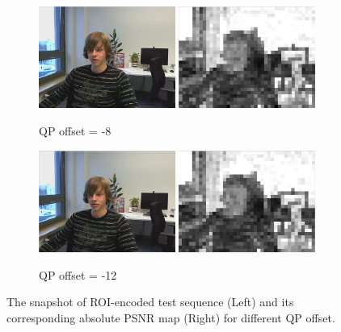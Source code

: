 \documentclass[11pt]{article} %
\begin{document}
%
\begin{figure}
	\centering
	\begin{subfigure}[t]{\textwidth}
		\centering
		\includegraphics[width=0.49\textwidth]{Tuning_QP_offset/QP_offset_8/with_swing_restriction/Paul250kbps_uni_QP_offset_8.jpg}
		\includegraphics[width=0.49\textwidth]{Tuning_QP_offset/QP_offset_8/with_swing_restriction/Paul250kbps_uni_QP_offset_8_psnr_abs.jpg}
		\caption{QP offset = -8}
		\label{fig:QP offset compare 8}
	\end{subfigure}
	\begin{subfigure}[t]{\textwidth}
		\centering
		\includegraphics[width=0.49\textwidth]{Tuning_QP_offset/QP_offset_12/with_swing_restriction/Paul250kbps_uni_QP_offset_12.jpg}
		\includegraphics[width=0.49\textwidth]{Tuning_QP_offset/QP_offset_12/with_swing_restriction/Paul250kbps_uni_QP_offset_12_psnr_abs.jpg}
		\caption{QP offset = -12}
		\label{fig:QP offset compare 12}
	\end{subfigure}
	\caption{The snapshot of ROI-encoded test sequence (Left) and its corresponding absolute PSNR map (Right) for different QP offset.}
	\label{fig:QP offset tuning}
\end{figure}
\end{document}
